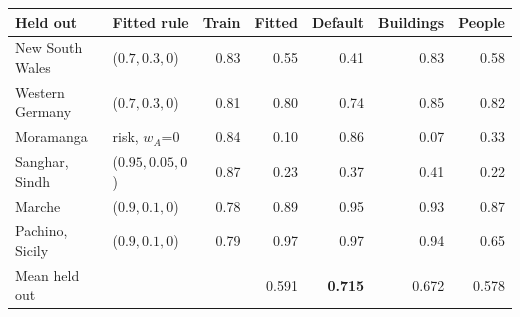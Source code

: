 \begin{tabular}{@{}llrrrrr@{}}
\toprule
Held out & Fitted rule & Train & Fitted & Default & Buildings & People \\
\midrule
New South Wales & ($0.7,0.3,0$) & 0.83 & 0.55 & 0.41 & 0.83 & 0.58 \\
Western Germany & ($0.7,0.3,0$) & 0.81 & 0.80 & 0.74 & 0.85 & 0.82 \\
Moramanga & risk, $w_A$=0 & 0.84 & 0.10 & 0.86 & 0.07 & 0.33 \\
Sanghar, Sindh & ($0.95,0.05,0$) & 0.87 & 0.23 & 0.37 & 0.41 & 0.22 \\
Marche & ($0.9,0.1,0$) & 0.78 & 0.89 & 0.95 & 0.93 & 0.87 \\
Pachino, Sicily & ($0.9,0.1,0$) & 0.79 & 0.97 & 0.97 & 0.94 & 0.65 \\
\midrule
Mean held out & & & 0.591 & \textbf{0.715} & 0.672 & 0.578 \\
\bottomrule
\end{tabular}
